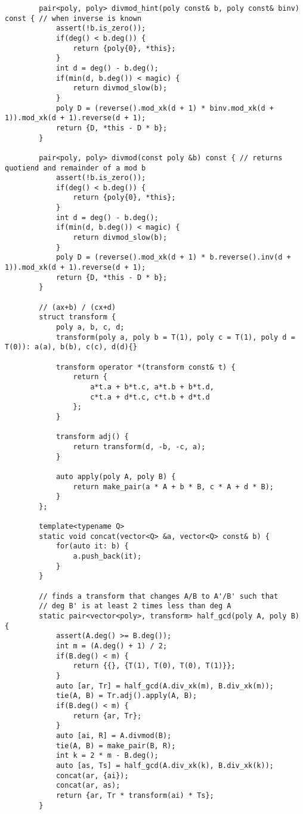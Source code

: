 \begin{lstlisting}
        pair<poly, poly> divmod_hint(poly const& b, poly const& binv) const { // when inverse is known
            assert(!b.is_zero());
            if(deg() < b.deg()) {
                return {poly{0}, *this};
            }
            int d = deg() - b.deg();
            if(min(d, b.deg()) < magic) {
                return divmod_slow(b);
            }
            poly D = (reverse().mod_xk(d + 1) * binv.mod_xk(d + 1)).mod_xk(d + 1).reverse(d + 1);
            return {D, *this - D * b};
        }
        
        pair<poly, poly> divmod(const poly &b) const { // returns quotiend and remainder of a mod b
            assert(!b.is_zero());
            if(deg() < b.deg()) {
                return {poly{0}, *this};
            }
            int d = deg() - b.deg();
            if(min(d, b.deg()) < magic) {
                return divmod_slow(b);
            }
            poly D = (reverse().mod_xk(d + 1) * b.reverse().inv(d + 1)).mod_xk(d + 1).reverse(d + 1);
            return {D, *this - D * b};
        }
        
        // (ax+b) / (cx+d)
        struct transform {
            poly a, b, c, d;
            transform(poly a, poly b = T(1), poly c = T(1), poly d = T(0)): a(a), b(b), c(c), d(d){}
            
            transform operator *(transform const& t) {
                return {
                    a*t.a + b*t.c, a*t.b + b*t.d,
                    c*t.a + d*t.c, c*t.b + d*t.d
                };
            }
            
            transform adj() {
                return transform(d, -b, -c, a);
            }
            
            auto apply(poly A, poly B) {
                return make_pair(a * A + b * B, c * A + d * B);
            }
        };
        
        template<typename Q>
        static void concat(vector<Q> &a, vector<Q> const& b) {
            for(auto it: b) {
                a.push_back(it);
            }
        }
        
        // finds a transform that changes A/B to A'/B' such that
        // deg B' is at least 2 times less than deg A
        static pair<vector<poly>, transform> half_gcd(poly A, poly B) {
            assert(A.deg() >= B.deg());
            int m = (A.deg() + 1) / 2;
            if(B.deg() < m) {
                return {{}, {T(1), T(0), T(0), T(1)}};
            }
            auto [ar, Tr] = half_gcd(A.div_xk(m), B.div_xk(m));
            tie(A, B) = Tr.adj().apply(A, B);
            if(B.deg() < m) {
                return {ar, Tr};
            }
            auto [ai, R] = A.divmod(B);
            tie(A, B) = make_pair(B, R);
            int k = 2 * m - B.deg();
            auto [as, Ts] = half_gcd(A.div_xk(k), B.div_xk(k));
            concat(ar, {ai});
            concat(ar, as);
            return {ar, Tr * transform(ai) * Ts};
        }
        

\end{lstlisting}
